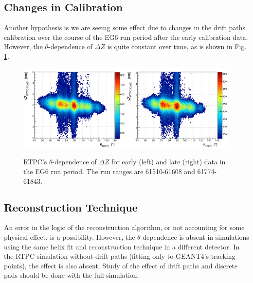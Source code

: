 \documentclass[amsmath,amssymb,notitlepage,11pt]{revtex4-1}
\begin{document}
\subsection{Changes in Calibration}
Another hypothesis is we are seeing some effect due to changes in the drift paths calibration over the course of the EG6 run period after the early calibration data.  However, the $\theta$-dependence of $\Delta Z$ is quite constant over time, as is shown in Fig. \ref{fig:dz_theta_runs}.
\begin{figure}[htbp]\centering
    \includegraphics[width=0.49\textwidth]{pics/dztheta_a_small.png}
    \includegraphics[width=0.49\textwidth]{pics/dztheta_c_small.png}
    \caption{RTPC's $\theta$-dependence of $\Delta Z$ for early (left) and late (right) data in the EG6 run period.  The run ranges are 61510-61608 and 61774-61843.\label{fig:dz_theta_runs}}
\end{figure}

\subsection{Reconstruction Technique}
An error in the logic of the reconstruction algorithm, or not accounting for some physical effect, is a possibility.  However, the $\theta$-dependence is absent in simulations using the same helix fit and reconstruction technique in a different detector.  In the RTPC simulation without drift paths (fitting only to GEANT4's tracking points), the effect is also absent.  Study of the effect of drift paths and discrete pads should be done with the full simulation.%
\end{document}
